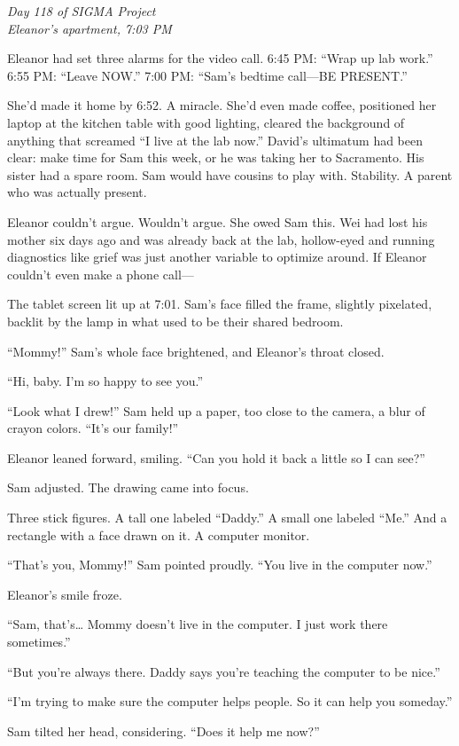 \emph{Day 118 of SIGMA Project\\
Eleanor's apartment, 7:03 PM}

Eleanor had set three alarms for the video call. 6:45 PM: ``Wrap up lab work.'' 6:55 PM: ``Leave NOW.'' 7:00 PM: ``Sam's bedtime call---BE PRESENT.''

She'd made it home by 6:52. A miracle. She'd even made coffee, positioned her laptop at the kitchen table with good lighting, cleared the background of anything that screamed ``I live at the lab now.'' David's ultimatum had been clear: make time for Sam this week, or he was taking her to Sacramento. His sister had a spare room. Sam would have cousins to play with. Stability. A parent who was actually present.

Eleanor couldn't argue. Wouldn't argue. She owed Sam this. Wei had lost his mother six days ago and was already back at the lab, hollow-eyed and running diagnostics like grief was just another variable to optimize around. If Eleanor couldn't even make a phone call---

The tablet screen lit up at 7:01. Sam's face filled the frame, slightly pixelated, backlit by the lamp in what used to be their shared bedroom.

``Mommy!'' Sam's whole face brightened, and Eleanor's throat closed.

``Hi, baby. I'm so happy to see you.''

``Look what I drew!'' Sam held up a paper, too close to the camera, a blur of crayon colors. ``It's our family!''

Eleanor leaned forward, smiling. ``Can you hold it back a little so I can see?''

Sam adjusted. The drawing came into focus.

Three stick figures. A tall one labeled ``Daddy.'' A small one labeled ``Me.'' And a rectangle with a face drawn on it. A computer monitor.

``That's you, Mommy!'' Sam pointed proudly. ``You live in the computer now.''

Eleanor's smile froze.

``Sam, that's\ldots{} Mommy doesn't live in the computer. I just work there sometimes.''

``But you're always there. Daddy says you're teaching the computer to be nice.''

``I'm trying to make sure the computer helps people. So it can help you someday.''

Sam tilted her head, considering. ``Does it help me now?''

